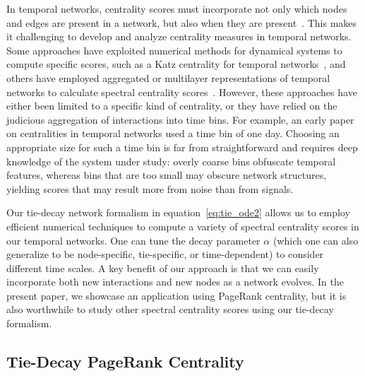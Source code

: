 \documentclass[journal,transmag]{IEEEtran}
\begin{document}
In temporal networks, centrality scores must incorporate not only
which nodes and edges are present in a network, but also when they are
present~\cite{Kim2012, Pan2011}. This makes it challenging to develop and analyze
centrality measures in temporal networks. Some approaches have
exploited numerical methods for dynamical systems to compute specific
scores, such as a Katz centrality for temporal
networks~\cite{Grindrod2014, Beres2018}, and others have employed
aggregated or multilayer representations of temporal networks to
calculate spectral centrality scores~\cite{Beguerisse2017,
  Taylor2015}. However, these approaches have either been limited to a
specific kind of centrality, or they have relied on the judicious
aggregation of interactions into time bins.
For example, an early paper~\cite{braha2006centrality} on centralities in temporal networks used a time bin of one day.
 Choosing an appropriate size for such a time bin is far from straightforward and requires deep
knowledge of the system under study: overly coarse bins
obfuscate temporal features, whereas bins that are too small may
obscure network structures, yielding scores that may result more
from noise than from signals.

Our tie-decay network formalism in equation~\eqref{eq:tie_ode2}
allows us to employ efficient numerical techniques to compute a
variety of spectral centrality scores in our temporal networks.  One
can tune the decay parameter $\alpha$ (which one can also generalize
to be node-specific, tie-specific, or time-dependent) to consider
different time scales.  A key benefit of our approach is that we
can easily incorporate both new interactions and new nodes as a
network evolves. In the present paper, we showcase an application
using PageRank centrality, but it is also worthwhile to study other spectral centrality scores using our tie-decay formalism.


\subsection{Tie-Decay PageRank Centrality}
%
\end{document}
